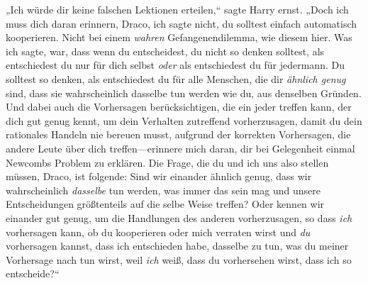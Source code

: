 „Ich würde dir keine falschen Lektionen erteilen,“ sagte Harry ernst. „Doch ich muss dich daran erinnern, Draco, ich sagte nicht, du solltest einfach automatisch kooperieren. Nicht bei einem \emph{wahren} Gefangenendilemma, wie diesem hier. Was ich sagte, war, dass wenn du entscheidest, du nicht so denken solltest, als entschiedest du nur für dich selbst \emph{oder} als entschiedest du für jedermann. Du solltest so denken, als entschiedest du für alle Menschen, die dir \emph{ähnlich genug} sind, dass sie wahrscheinlich dasselbe tun werden wie du, aus denselben Gründen. Und dabei auch die Vorhersagen berücksichtigen, die ein jeder treffen kann, der dich gut genug kennt, um dein Verhalten zutreffend vorherzusagen, damit du dein rationales Handeln nie bereuen musst, aufgrund der korrekten Vorhersagen, die andere Leute über dich treffen—erinnere mich daran, dir bei Gelegenheit einmal Newcombs Problem zu erklären. Die Frage, die du und ich uns also stellen müssen, Draco, ist folgende: Sind wir einander ähnlich genug, dass wir wahrscheinlich \emph{dasselbe} tun werden, was immer das sein mag und unsere Entscheidungen größtenteils auf die selbe Weise treffen? Oder kennen wir einander gut genug, um die Handlungen des anderen vorherzusagen, so dass \emph{ich} vorhersagen kann, ob du kooperieren oder mich verraten wirst und \emph{du} vorhersagen kannst, dass ich entschieden habe, dasselbe zu tun, was du meiner Vorhersage nach tun wirst, weil \emph{ich} weiß, dass du vorhersehen wirst, dass ich so entscheide?“

